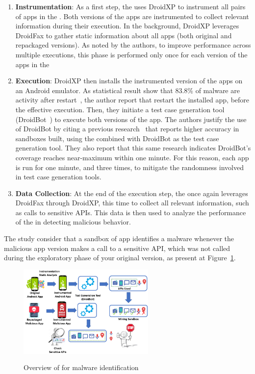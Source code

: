 \begin{enumerate}[1.]
 \item \textbf{Instrumentation}: As a first step, the \fhc uses DroidXP to instrument all pairs of apps in the \cds. Both versions of the apps are instrumented to collect relevant information during their execution. In the background, DroidXP leverages DroidFax to gather static information about all apps (both original and repackaged versions). As noted by the authors, to improve performance across multiple executions, this phase is performed only once for each version of the apps in the \cds


\item \textbf{Execution}: DroidXP then installs the instrumented version of the apps on an Android emulator. As statistical result show that $83.8\%$ of malware are activity after restart~\cite{DBLP:conf/sp/ZhouJ12}, the author report that restart the installed app, before the effective execution. Then, they initiate a test case generation tool (DroidBot~\cite{DBLP:conf/icse/LiYGC17}) to execute both versions of the app. The authors justify the use of DroidBot by citing a previous research~\cite{DBLP:conf/wcre/BaoLL18} that reports higher accuracy in sandboxes built, using the \mas combined with DroidBot as the test case generation tool. They also report that this same research indicates DroidBot’s coverage reaches near-maximum within one minute. For this reason, each app is run for one minute, and three times, to mitigate the randomness involved in test case generation tools.

\item \textbf{Data Collection}: At the end of the execution step, the \fhc once again leverages DroidFax through DroidXP, this time to collect all relevant information, such as calls to sensitive APIs. This data is then used to analyze the performance of the \mas in detecting malicious behavior.
\end{enumerate}


The study consider that a sandbox of app identifies a malware whenever the malicious app version makes a call to a sensitive API, which was not called during the exploratory phase of your original version, as present at Figure~\ref{fig:mine}.


\begin{figure}[h]
  \centering
  
    \includegraphics[width=0.60\textwidth]{image/mineSandbox.png} \\[\abovecaptionskip]
    
  \caption{Overview of \mas for malware identification}\label{fig:mine}
\end{figure}


